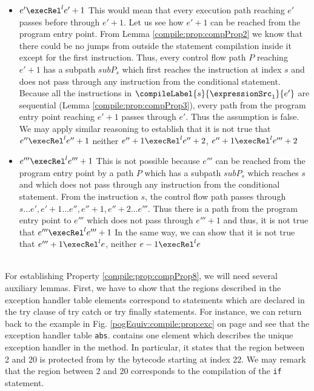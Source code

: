 \begin{description}
 \begin{itemize}
       \item  $e' \execRel^{l} e'+1 $ This would mean that every execution path reaching $e'$ passes before through $e'+1$.
             Let us see how $e'+1$ can be reached from the program entry point.
             From Lemma \ref{compile:prop:compProp2} we know that there could be no jumps from outside the statement compilation inside it 
	     except for the first instruction. Thus, every control flow path $P$ reaching $e'+1$ has a subpath $subP_s$ which first 
	     reaches the instruction at index $s$ and does not pass through any instruction from the conditional statement.
	      Because all the instructions in $\compileLabel{s}{\expressionSrc_1}{e'}$ are sequential (Lemma \ref{compile:prop:compProp3}), every path from the 
	     program entry point reaching $e'+1$ passes through $e'$. Thus the assumption is false.
	     We may apply similar reasoning to establish that it is not true that  $e'' \execRel^{l} e''+1 $ neither $e''+ 1 \execRel^{l} e''+2$, 
	     $e'' + 1 \execRel^{l} e'''+2 $

      
      \item $e''' \execRel^{l} e'''+1$ This is not possible because $e'''$ can be reached from the program entry point by a path $P $ which has 
           a subpath $subP_s$ which reaches $s$ and which does not pass through any instruction from the conditional statement.
	   From the instruction $s$, the control flow path 
	   passes through $s \ldots e', e' +1 \ldots e'', e''+1, e''+2\ldots e''' $. Thus there is a path from the 
	   program entry point to  $e'''$ which does not pass through $e'''+1$ and thus, it is not true  that $e''' \execRel^{l} e'''+1$
	   In the same way, we can show that it is not true that  $e''' + 1 \execRel^{l} e$, neither $ e -1 \execRel^{l} e  $
	       
 \end{itemize}

\end{description}
\Qed\\


For establishing Property \ref{compile:prop:compProp8}, we will need several auxiliary lemmas. First, we have to show that the regions described in the exception  handler table elements  
correspond to statements which are declared in the try clause of try catch or try finally statements.  
For instance, we can return back to the example in Fig. \ref{pogEquiv:compile:prop:exc} on page \pageref{pogEquiv:compile:prop:exc} 
and see that  the exception handler table  \lstinline!abs!.\ExcHandler{}  contains one element which describes the unique exception handler
in the method. In particular, it states that the region between 2 and 20 is protected from \NullPointerExc{} by the bytecode starting at index 22.
 We may remark that the region between 2 and 20 corresponds to the compilation of the \lstinline!if! statement. 

